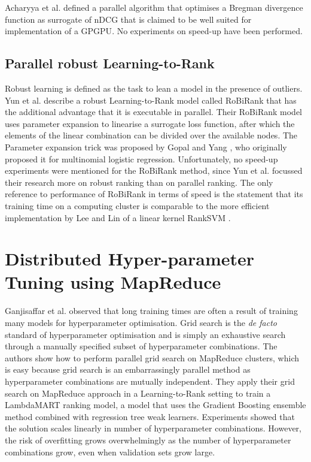 Acharyya et al. \cite{Acharyya2012} defined a parallel algorithm that optimises a Bregman divergence function as surrogate of \ac{nDCG} that is claimed to be well suited for implementation of a \ac{GPGPU}. No experiments on speed-up have been performed.
\subsection{Parallel robust Learning-to-Rank}
Robust learning \cite{Huber1981} is defined as the task to lean a model in the presence of outliers. Yun et al. describe a \cite{Yun2014} robust Learning-to-Rank model called RoBiRank that has the additional advantage that it is executable in parallel. Their RoBiRank model uses parameter expansion to linearise a surrogate loss function, after which the elements of the linear combination can be divided over the available nodes. The Parameter expansion trick was proposed by Gopal and Yang \cite{Gopal2013}, who originally proposed it for multinomial logistic regression. Unfortunately, no speed-up experiments were mentioned for the RoBiRank method, since Yun et al. focussed their research more on robust ranking than on parallel ranking. The only reference to performance of RoBiRank in terms of speed is the statement that its training time on a computing cluster is comparable to the more efficient implementation by Lee and Lin \cite{Lee2014} of a linear kernel RankSVM \cite{Herbrich1999, Joachims2002}.\\

\section{Distributed Hyper-parameter Tuning using MapReduce}
Ganjisaffar et al. \cite{Ganjisaffar2011, Ganjisaffar2011b} observed that long training times are often a result of training many models for hyperparameter optimisation. Grid search is the \emph{de facto} standard of hyperparameter optimisation and is simply an exhaustive search through a manually specified subset of hyperparameter combinations. The authors show how to perform parallel grid search on MapReduce clusters, which is easy because grid search is an embarrassingly parallel method as hyperparameter combinations are mutually independent. They apply their grid search on MapReduce approach in a Learning-to-Rank setting to train a LambdaMART \cite{Wu2008} ranking model, a model that uses the Gradient Boosting \cite{Friedman2002} ensemble method combined with regression tree weak learners. Experiments showed that the solution scales linearly in number of hyperparameter combinations. However, the risk of overfitting grows overwhelmingly as the number of hyperparameter combinations grow, even when validation sets grow large.

